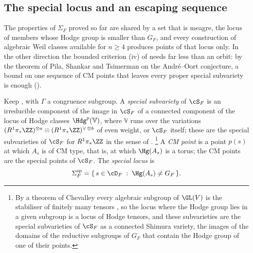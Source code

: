 \subsection{The special locus and an escaping sequence}
\label{ssec:speciallocus}

The properties of $\Sigma_{F}$ proved so far are shared by a set that is
meagre, the locus of members whose Hodge group is smaller than
$G_{F}$, and every construction of algebraic Weil classes available for
$n\ge4$ produces points of that locus only. In the other direction the
bounded criterion (iv) of  needs far less than an
orbit: by the theorem of Pila, Shankar and Tsimerman on the Andr\'e--Oort
conjecture, a bound on one sequence of CM points that leaves every proper
special subvariety is enough ().

\begin{definition}
\label{def:speciallocus}
Keep , with $\Gamma$ a congruence subgroup. A
\emph{special subvariety} of $\cS_{F}$ is an irreducible component of the
image in $\cS_{F}$ of a connected component of the locus of Hodge classes
$\Hdg^{p}(\mathbb{V})$, where $\mathbb{V}$ runs over the variations
$(R^{1}\pi_{*}\ZZ)^{\otimes a}\otimes(R^{1}\pi_{*}\ZZ)^{\vee\,\otimes b}$
of even weight, or $\cS_{F}$ itself; these are the special subvarieties of
$\cS_{F}$ for $R^{1}\pi_{*}\ZZ$ in the sense of \cite{KOU}.%
\footnote{By a theorem of Chevalley every algebraic subgroup of $\GL(V)$ is
the stabiliser of finitely many tensors \cite[\S3]{Del82}, so the locus where
the Hodge group lies in a given subgroup is a locus of Hodge tensors, and
these subvarieties are the special subvarieties of $\cS_{F}$ as a connected
Shimura variety, the images of the domains of the reductive subgroups of
$G_{F}$ that contain the Hodge group of one of their points.}
A \emph{CM point} is a point $p(s)$ at which $A_{s}$ is of CM type, that is,
at which $\Hg(A_{s})$ is a torus; the CM points are the special points of
$\cS_{F}$. The \emph{special locus} is
\[
  \Sigma^{\mathrm{sp}}_{F}
  =\{\,s\in\cD_{F}\;:\;\Hg(A_{s})\ne G_{F}\,\}.
\]
\end{definition}

